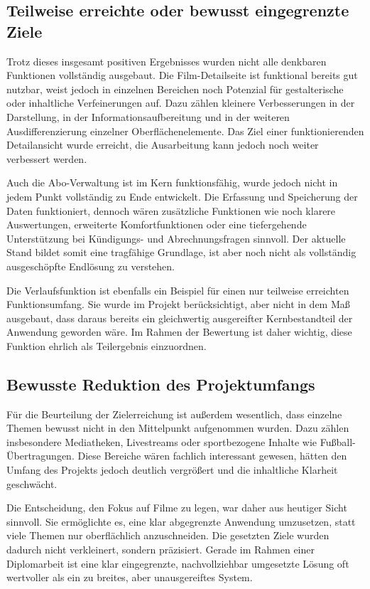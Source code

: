 \subsection{Teilweise erreichte oder bewusst eingegrenzte Ziele}
Trotz dieses insgesamt positiven Ergebnisses wurden nicht alle denkbaren Funktionen vollständig ausgebaut. Die Film-Detailseite ist funktional bereits gut nutzbar, weist jedoch in einzelnen Bereichen noch Potenzial für gestalterische oder inhaltliche Verfeinerungen auf. Dazu zählen kleinere Verbesserungen in der Darstellung, in der Informationsaufbereitung und in der weiteren Ausdifferenzierung einzelner Oberflächenelemente. Das Ziel einer funktionierenden Detailansicht wurde erreicht, die Ausarbeitung kann jedoch noch weiter verbessert werden.

Auch die Abo-Verwaltung ist im Kern funktionsfähig, wurde jedoch nicht in jedem Punkt vollständig zu Ende entwickelt. Die Erfassung und Speicherung der Daten funktioniert, dennoch wären zusätzliche Funktionen wie noch klarere Auswertungen, erweiterte Komfortfunktionen oder eine tiefergehende Unterstützung bei Kündigungs- und Abrechnungsfragen sinnvoll. Der aktuelle Stand bildet somit eine tragfähige Grundlage, ist aber noch nicht als vollständig ausgeschöpfte Endlösung zu verstehen.

Die Verlaufsfunktion ist ebenfalls ein Beispiel für einen nur teilweise erreichten Funktionsumfang. Sie wurde im Projekt berücksichtigt, aber nicht in dem Maß ausgebaut, dass daraus bereits ein gleichwertig ausgereifter Kernbestandteil der Anwendung geworden wäre. Im Rahmen der Bewertung ist daher wichtig, diese Funktion ehrlich als Teilergebnis einzuordnen.

\subsection{Bewusste Reduktion des Projektumfangs}
Für die Beurteilung der Zielerreichung ist außerdem wesentlich, dass einzelne Themen bewusst nicht in den Mittelpunkt aufgenommen wurden. Dazu zählen insbesondere Mediatheken, Livestreams oder sportbezogene Inhalte wie Fußball-Übertragungen. Diese Bereiche wären fachlich interessant gewesen, hätten den Umfang des Projekts jedoch deutlich vergrößert und die inhaltliche Klarheit geschwächt.

Die Entscheidung, den Fokus auf Filme zu legen, war daher aus heutiger Sicht sinnvoll. Sie ermöglichte es, eine klar abgegrenzte Anwendung umzusetzen, statt viele Themen nur oberflächlich anzuschneiden. Die gesetzten Ziele wurden dadurch nicht verkleinert, sondern präzisiert. Gerade im Rahmen einer Diplomarbeit ist eine klar eingegrenzte, nachvollziehbar umgesetzte Lösung oft wertvoller als ein zu breites, aber unausgereiftes System.

